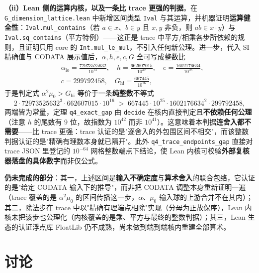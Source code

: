 \documentclass[12pt,a4paper]{article}
\begin{document}
\textbf{（ii）Lean 侧的运算内核，以及一条比 trace 更强的判据}。在 \texttt{G\_\allowbreak{}dimension\_\allowbreak{}lattice.lean} 中新增区间类型 \texttt{Ival} 与其运算，并机器证明\textbf{运算健全性}：\texttt{Ival.mul\_\allowbreak{}contains}（若 $a\in x$、$b\in y$ 且 $x,y$ 非负，则 $a b \in x\!\cdot\!y$）与 \texttt{Ival.sq\_\allowbreak{}contains}（平方特例）——这正是 trace 中平方/相乘各步所依赖的规则，且证明只用 core 的 \texttt{Int.mul\_\allowbreak{}le\_\allowbreak{}mul}，不引入任何新公理。进一步，代入 SI 精确值与 CODATA 展示值后，$\alpha,h,e,c,G$ 全可写成整数比
\[
  \begin{aligned}
  &\alpha_{\text{lo}} = \frac{72973525632}{10^{13}},\quad
  h = \frac{662607015}{10^{42}},\quad
  e = \frac{1602176634}{10^{28}},\\[2pt]
  &c = 299792458,\quad
  G_{\text{hi}} = \frac{667445}{10^{16}},
  \end{aligned}
\]
于是判定式 $\alpha^2\mu_0 > G_{\text{hi}}$ 等价于一条\textbf{纯整数}不等式
\begin{equation}
  2\cdot 72973525632^{3}\cdot 662607015\cdot 10^{16}
  \;>\; 667445\cdot 10^{25}\cdot 1602176634^{2}\cdot 299792458 ,
\end{equation}
两端皆为常量，定理 \texttt{q4\_\allowbreak{}exact\_\allowbreak{}gap} 由 \texttt{decide} 在核内直接判定且\textbf{不依赖任何公理}（注意 $h$ 的尾数有 9 位，故指数为 $10^{42}$ 而非 $10^{41}$）。这意味着本判据\textbf{连舍入都不需要}——比 trace 更强：trace 认证的是"逐舍入的外包围区间不相交"，而该整数判据认证的是"精确有理数本身就已隔开"。此外 \texttt{q4\_\allowbreak{}trace\_\allowbreak{}endpoints\_\allowbreak{}gap} 直接对 trace JSON 里登记的 $10^{-64}$ 网格整数端点下结论，使 Lean 内核可校验\textbf{外部复核器落盘的具体数字}而非仅公式。

\textbf{仍未完成的部分}：其一，上述区间是\textbf{输入不确定度}与\textbf{算术舍入}的联合包络，它认证的是"给定 CODATA 输入下的推导"，而非把 CODATA 调整本身重新证明一遍（trace 覆盖的是 $\alpha^2\mu_0$ 的区间传播这一步，$\alpha$、$\mu_0$ 输入球的上游合并不在其内）；其二，除法步在 trace 中以"精确有理端点相除"实现（分母为正故保序），Lean 内核未把该步也公理化（内核覆盖的是乘、平方与最终的整数判据）；其三，Lean 生态的认证浮点库 FloatLib 仍不成熟，尚未做到端到端核内重建全部算术。

\section{讨论}
\end{document}
